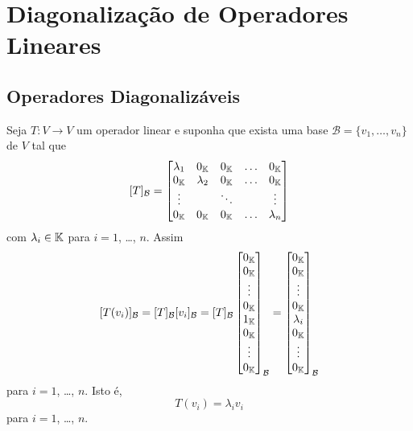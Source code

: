
\chapter{Diagonalização de Operadores Lineares}

\section{Operadores Diagonaliz\'aveis} %
\label{sec:operadores_diagonalizaveis}

Seja $T : V \to V$ um operador linear e suponha que exista uma base $\mathcal{B} = \{v_1,\dots,v_n\}$ de $V$ tal que
\begin{align}\label{formadiagonal}
	[T]_\mathcal{B} = \begin{bmatrix}
		\lambda_1 & 0_{\mathbb{K}} & 0_{\mathbb{K}} & \dots & 0_{\mathbb{K}}\\
		0_{\mathbb{K}} & \lambda_2 & 0_{\mathbb{K}} & \dots & 0_{\mathbb{K}}\\
		\vdots & & \ddots & & \vdots\\
		0_{\mathbb{K}} & 0_{\mathbb{K}} & 0_{\mathbb{K}} & \dots & \lambda_n
	\end{bmatrix}
\end{align}
com $\lambda_i \in \mathbb{K}$ para $i = 1$, \dots, $n$. Assim
\[
	[T(v_i)]_\mathcal{B} = [T]_\mathcal{B}[v_i]_\mathcal{B} = [T]_\mathcal{B}\begin{bmatrix}
		0_{\mathbb{K}}\\
		0_{\mathbb{K}}\\
		\vdots\\
		0_{\mathbb{K}}\\
		1_{\mathbb{K}}\\
		0_{\mathbb{K}}\\
		\vdots\\
		0_{\mathbb{K}}
	\end{bmatrix}_\mathcal{B} = \begin{bmatrix}
		0_{\mathbb{K}}\\
		0_{\mathbb{K}}\\
		\vdots\\
		0_{\mathbb{K}}\\
		\lambda_i\\
		0_{\mathbb{K}}\\
		\vdots\\
		0_{\mathbb{K}}
	\end{bmatrix}_\mathcal{B}
\]
para $i = 1$, \dots, $n$. Isto \'e,
\[
	T(v_i) = \lambda_i v_i
\]
para $i = 1$, \dots, $n$.

